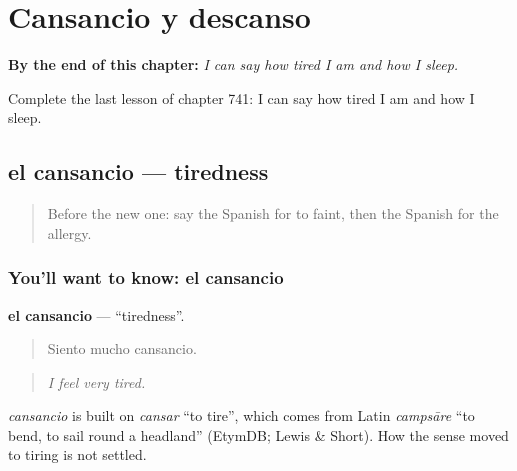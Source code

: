 
\chapter{Cansancio y descanso}
\label{ch:es-cansancio-y-descanso}

\begin{chapteropening}
\textbf{By the end of this chapter:} \emph{I can say how tired I am and how I sleep.}

Complete the last lesson of chapter 741: I can say how tired I am and how I sleep.
\end{chapteropening}

\section[el cansancio]{el cansancio — tiredness}

\label{lesson:ES-C741-cansancio}



\begin{quote}
Before the new one: say the Spanish for to faint, then the Spanish for the allergy.
\end{quote}

\subsection*{You'll want to know: el cansancio}
\textbf{el cansancio} — \textquotedblleft{}tiredness\textquotedblright{}.

\begin{quote}
Siento mucho cansancio.
\end{quote}

\begin{quote}
\emph{I feel very tired.}
\end{quote}

\begin{cousinweb}
\emph{cansancio} is built on \emph{cansar} \textquotedblleft{}to tire\textquotedblright{}, which comes from Latin \emph{campsāre} \textquotedblleft{}to bend, to sail round a headland\textquotedblright{} (EtymDB; Lewis \& Short). How the sense moved to tiring is not settled.
\end{cousinweb}

